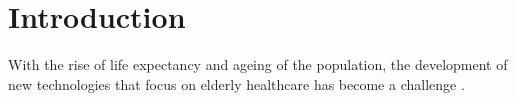 \documentclass[journal,article,submit,moreauthors,pdftex]{Definitions/mdpi}
\begin{document}


\section{Introduction}

With the rise of life expectancy and ageing of the population, the development of new technologies that focus on elderly healthcare has become a challenge \cite{hong2008activity}.
\end{document}
